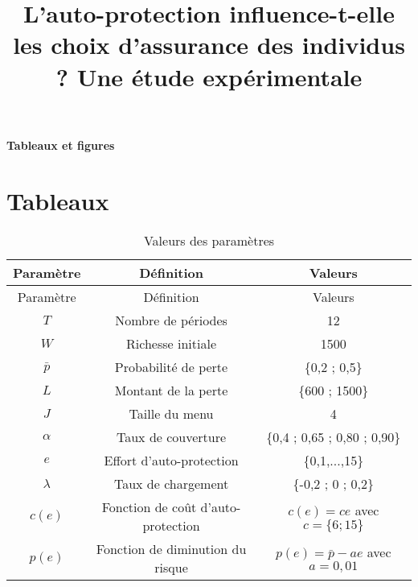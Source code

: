 \documentclass[11pt]{article}
\date{}
\title{L'auto-protection influence-t-elle les choix d'assurance des individus ? Une étude expérimentale}
\date{}
\begin{document}
\maketitle

\begin{center}
\textbf{Tableaux et figures}
\end{center}

\section{Tableaux}


\begin{longtable}[c]{ccc}
\caption{Valeurs des paramètres}
\label{tab:parameters}\\

\hline\hline
Paramètre&Définition&Valeurs\\
\hline
\endfirsthead

\hline
Paramètre&Définition&Valeurs\\
\hline
\endhead

\hline
\endfoot

\hline\hline
\endlastfoot
$T$&Nombre de périodes&12\\
$W$&Richesse initiale&1500\\
$\bar{p}$&Probabilité de perte&\{0,2 ; 0,5\}\\
$L$&Montant de la perte&\{600 ; 1500\}\\
$J$&Taille du menu&4\\
$\alpha$&Taux de couverture&\{0,4 ; 0,65 ; 0,80 ; 0,90\}\\
$e$&Effort d'auto-protection&\{0,1,...,15\}\\
$\lambda$&Taux de chargement&\{-0,2 ; 0 ; 0,2\}\\
$c(e)$&Fonction de coût d'auto-protection&$c(e)=c e $ avec $
c = \{6 ; 15\}$\\
$p(e)$&Fonction de diminution du risque &$p(e)=\bar{p} - a e $ avec $ a=0,01$\\
\end{longtable}

\newpage


\footnotesize
\end{document}
